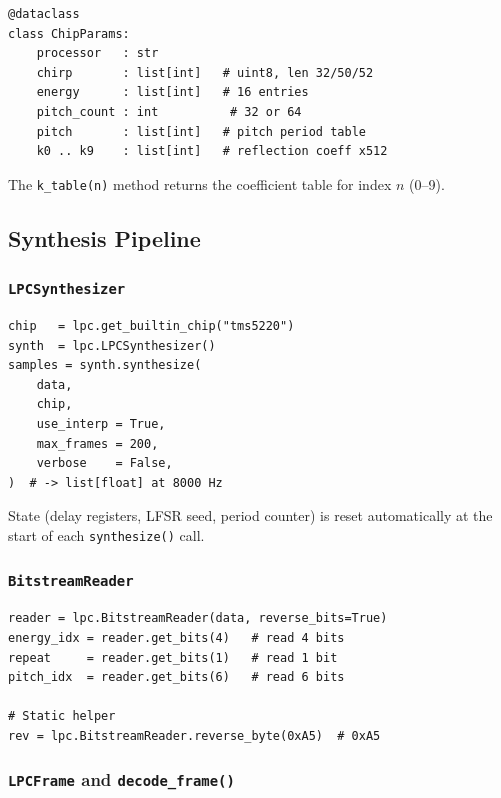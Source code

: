 \documentclass[10pt]{article}
\begin{document}
\begin{lstlisting}
@dataclass
class ChipParams:
    processor   : str
    chirp       : list[int]   # uint8, len 32/50/52
    energy      : list[int]   # 16 entries
    pitch_count : int          # 32 or 64
    pitch       : list[int]   # pitch period table
    k0 .. k9    : list[int]   # reflection coeff x512
\end{lstlisting}

The \texttt{k\_table(n)} method returns the coefficient table for index $n$
(0--9).

\subsection{Synthesis Pipeline}

\subsubsection{\texttt{LPCSynthesizer}}

\begin{lstlisting}[caption={Mid-level synthesis}]
chip   = lpc.get_builtin_chip("tms5220")
synth  = lpc.LPCSynthesizer()
samples = synth.synthesize(
    data,
    chip,
    use_interp = True,
    max_frames = 200,
    verbose    = False,
)  # -> list[float] at 8000 Hz
\end{lstlisting}

State (delay registers, LFSR seed, period counter) is reset automatically at
the start of each \texttt{synthesize()} call.

\subsubsection{\texttt{BitstreamReader}}

\begin{lstlisting}[caption={Low-level bitstream access}]
reader = lpc.BitstreamReader(data, reverse_bits=True)
energy_idx = reader.get_bits(4)   # read 4 bits
repeat     = reader.get_bits(1)   # read 1 bit
pitch_idx  = reader.get_bits(6)   # read 6 bits

# Static helper
rev = lpc.BitstreamReader.reverse_byte(0xA5)  # 0xA5
\end{lstlisting}

\subsubsection{\texttt{LPCFrame} and \texttt{decode\_frame()}}
\end{document}
